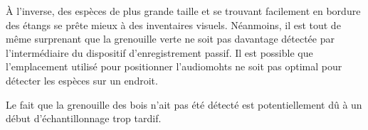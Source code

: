 À l'inverse, des espèces de plus grande taille et se trouvant facilement en bordure des étangs se prête mieux à des inventaires visuels. Néanmoins, il est tout de même surprenant que la grenouille verte ne soit pas davantage détectée par l'intermédiaire du dispositif d'enregistrement passif. Il est possible que l'emplacement utilisé pour positionner l'audiomohts ne soit pas optimal pour détecter les espèces sur un endroit. 

Le fait que la grenouille des bois n'ait pas été détecté est potentiellement dû à un début d'échantillonnage trop tardif. 

